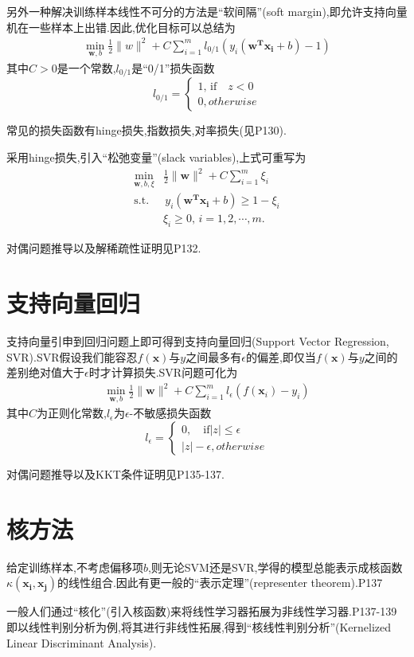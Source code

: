 另外一种解决训练样本线性不可分的方法是``软间隔''(soft margin),即允许支持向量机在一些样本上出错.因此,优化目标可以总结为
\begin{equation}\begin{split}
\min_{\bm w,b}\frac{1}{2}\|w\|^2+C\sum_{i=1}^ml_{0/1}(y_i(\bm{w^Tx_i}+b)-1)
\end{split}\end{equation}
其中$C>0$是一个常数,$l_{0/1}$是``0/1''损失函数
\begin{equation}l_{0/1}=\left\{\begin{array}{ll}
1,\,\text{if}\quad z<0\\
0,otherwise
\end{array}\right.\end{equation}

常见的损失函数有hinge损失,指数损失,对率损失(见P130).

采用hinge损失,引入``松弛变量''(slack variables),上式可重写为
\begin{equation}\begin{split}
\min_{\bm w,b,\xi}&\frac{1}{2}\|\bm w\|^2+C\sum_{i=1}^m\xi_i\\
\text{s.t.}&\,y_i(\bm{w^Tx_i}+b)\ge1-\xi_i\\
&\xi_i\ge0,\,i=1,2,\cdots,m.
\end{split}\end{equation}

对偶问题推导以及解稀疏性证明见P132.

\section{支持向量回归}

支持向量引申到回归问题上即可得到支持向量回归(Support Vector Regression, SVR).SVR假设我们能容忍$f(\bm x)$与$y$之间最多有$\epsilon$的偏差,即仅当$f(\bm x)$与$y$之间的差别绝对值大于$\epsilon$时才计算损失.SVR问题可化为
\begin{equation}\begin{split}
\min_{\bm w,b}\frac{1}{2}\|\bm w\|^2+C\sum_{i=1}^ml_\epsilon(f(\bm x_i)-y_i)
\end{split}\end{equation}
其中$C$为正则化常数,$l_\epsilon$为$\epsilon$-不敏感损失函数
\begin{equation}l_\epsilon=\left\{\begin{array}{ll}
0,\quad\text{if}|z|\le\epsilon\\
|z|-\epsilon,otherwise
\end{array}\right.\end{equation}

对偶问题推导以及KKT条件证明见P135-137.

\section{核方法}

给定训练样本,不考虑偏移项$b$,则无论SVM还是SVR,学得的模型总能表示成核函数$\kappa(\bm{x_i,x_j})$的线性组合.因此有更一般的``表示定理''(representer theorem).P137

一般人们通过``核化''(引入核函数)来将线性学习器拓展为非线性学习器.P137-139即以线性判别分析为例,将其进行非线性拓展,得到``核线性判别分析''(Kernelized Linear Discriminant Analysis).
